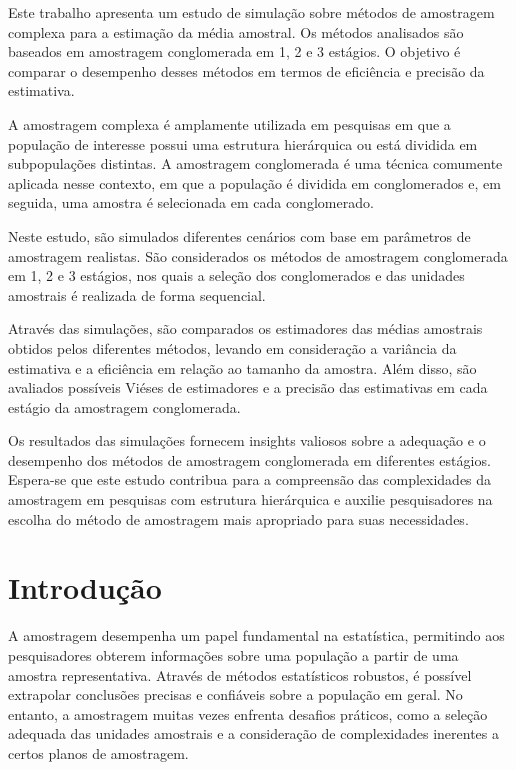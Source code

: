 \documentclass[sn-basic,pdflatex]{sn-jnl}
\theoremstyle{remark}
\theoremstyle{definition}
\begin{document}
Este trabalho apresenta um estudo de simulação sobre métodos de
amostragem complexa para a estimação da média amostral. Os métodos
analisados são baseados em amostragem conglomerada em 1, 2 e 3 estágios.
O objetivo é comparar o desempenho desses métodos em termos de
eficiência e precisão da estimativa.

A amostragem complexa é amplamente utilizada em pesquisas em que a
população de interesse possui uma estrutura hierárquica ou está dividida
em subpopulações distintas. A amostragem conglomerada é uma técnica
comumente aplicada nesse contexto, em que a população é dividida em
conglomerados e, em seguida, uma amostra é selecionada em cada
conglomerado.

Neste estudo, são simulados diferentes cenários com base em parâmetros
de amostragem realistas. São considerados os métodos de amostragem
conglomerada em 1, 2 e 3 estágios, nos quais a seleção dos conglomerados
e das unidades amostrais é realizada de forma sequencial.

Através das simulações, são comparados os estimadores das médias
amostrais obtidos pelos diferentes métodos, levando em consideração a
variância da estimativa e a eficiência em relação ao tamanho da amostra.
Além disso, são avaliados possíveis Viéses de estimadores e a precisão
das estimativas em cada estágio da amostragem conglomerada.

Os resultados das simulações fornecem insights valiosos sobre a
adequação e o desempenho dos métodos de amostragem conglomerada em
diferentes estágios. Espera-se que este estudo contribua para a
compreensão das complexidades da amostragem em pesquisas com estrutura
hierárquica e auxilie pesquisadores na escolha do método de amostragem
mais apropriado para suas necessidades.

\hypertarget{introduuxe7uxe3o}{%
\section{Introdução}\label{introduuxe7uxe3o}}

A amostragem desempenha um papel fundamental na estatística, permitindo
aos pesquisadores obterem informações sobre uma população a partir de
uma amostra representativa. Através de métodos estatísticos robustos, é
possível extrapolar conclusões precisas e confiáveis sobre a população
em geral. No entanto, a amostragem muitas vezes enfrenta desafios
práticos, como a seleção adequada das unidades amostrais e a
consideração de complexidades inerentes a certos planos de amostragem.
\end{document}
